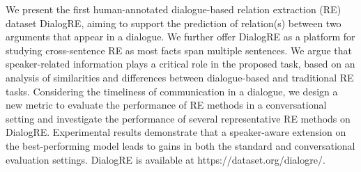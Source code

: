 We present the first human-annotated dialogue-based relation extraction (RE) dataset DialogRE, aiming to support the prediction of relation(s) between two arguments that appear in a dialogue. We further offer DialogRE as a platform for studying cross-sentence RE as most facts span multiple sentences. We argue that speaker-related information plays a critical role in the proposed task, based on an analysis of similarities and differences between dialogue-based and traditional RE tasks. Considering the timeliness of communication in a dialogue, we design a new metric to evaluate the performance of RE methods in a conversational setting and investigate the performance of several representative RE methods on DialogRE. Experimental results demonstrate that a speaker-aware extension on the best-performing model leads to gains in both the standard and conversational evaluation settings. DialogRE is available at https://dataset.org/dialogre/.
